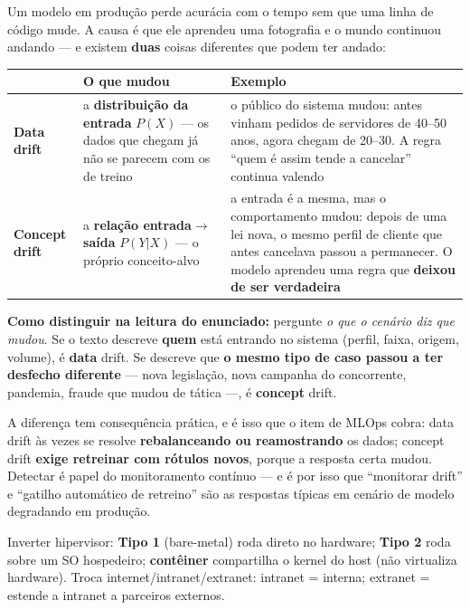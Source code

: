 \begin{conceito}
Um modelo em produção perde acurácia com o tempo sem que uma linha de código
mude. A causa é que ele aprendeu uma fotografia e o mundo continuou andando ---
e existem \textbf{duas} coisas diferentes que podem ter andado:

\begin{center}
\begin{tabular}{@{}p{2.6cm}p{4.2cm}p{4.8cm}@{}}
\toprule
& \textbf{O que mudou} & \textbf{Exemplo} \\
\midrule
\textbf{Data drift} & a \textbf{distribuição da entrada} $P(X)$ --- os dados
que chegam já não se parecem com os de treino & o público do sistema mudou:
antes vinham pedidos de servidores de 40--50 anos, agora chegam de 20--30. A
regra ``quem é assim tende a cancelar'' continua valendo \\
\addlinespace
\textbf{Concept drift} & a \textbf{relação entrada$\to$saída} $P(Y|X)$ --- o
próprio conceito-alvo & a entrada é a mesma, mas o comportamento mudou: depois
de uma lei nova, o mesmo perfil de cliente que antes cancelava passou a
permanecer. O modelo aprendeu uma regra que \textbf{deixou de ser verdadeira}
\\
\bottomrule
\end{tabular}
\end{center}

\textbf{Como distinguir na leitura do enunciado:} pergunte \emph{o que o
cenário diz que mudou}. Se o texto descreve \textbf{quem} está entrando no
sistema (perfil, faixa, origem, volume), é \textbf{data} drift. Se descreve
que \textbf{o mesmo tipo de caso passou a ter desfecho diferente} --- nova
legislação, nova campanha do concorrente, pandemia, fraude que mudou de
tática ---, é \textbf{concept} drift.

A diferença tem consequência prática, e é isso que o item de MLOps cobra: data
drift às vezes se resolve \textbf{rebalanceando ou reamostrando} os dados;
concept drift \textbf{exige retreinar com rótulos novos}, porque a resposta
certa mudou. Detectar é papel do monitoramento contínuo --- e é por isso que
``monitorar drift'' e ``gatilho automático de retreino'' são as respostas
típicas em cenário de modelo degradando em produção.
\end{conceito}

\begin{pegadinha}
Inverter hipervisor: \textbf{Tipo 1} (bare-metal) roda direto no hardware;
\textbf{Tipo 2} roda sobre um SO hospedeiro; \textbf{contêiner} compartilha o
kernel do host (não virtualiza hardware). Troca internet/intranet/extranet:
intranet = interna; extranet = estende a intranet a parceiros externos.
\end{pegadinha}

